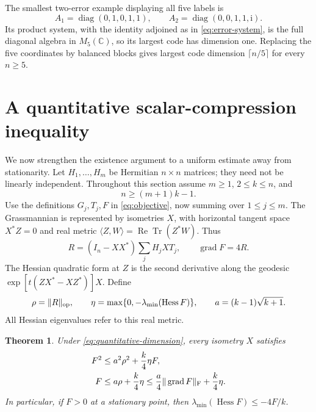 \documentclass[11pt]{article}
\newcommand{\C}{\mathbb C}
\DeclareMathOperator{\Tr}{Tr}
\newtheorem{theorem}{Theorem}[section]
\theoremstyle{remark}
\numberwithin{equation}{section}
\begin{document}
The smallest two-error example displaying all five labels is
\begin{equation}\label{eq:five-block-example}
 A_1=\operatorname{diag}(0,1,0,1,1),\qquad
 A_2=\operatorname{diag}(0,0,1,1,\mathrm{i}).
\end{equation}
Its product system, with the identity adjoined as in
\eqref{eq:error-system}, is the full diagonal algebra in $M_5(\C)$,
so its largest code has dimension one. Replacing the five coordinates
by balanced blocks gives largest code dimension $\lceil n/5\rceil$
for every $n\ge5$.

\section{A quantitative scalar-compression inequality}\label{sec:quantitative}

We now strengthen the existence argument to a uniform estimate away from
stationarity. Let $H_1,\ldots,H_m$ be Hermitian $n\times n$ matrices;
they need not be linearly independent. Throughout this section assume
$m\ge1$, $2\le k\le n$, and
\begin{equation}\label{eq:quantitative-dimension}
 n\ge(m+1)k-1.
\end{equation}
Use the definitions $G_j,T_j,F$ in \eqref{eq:objective}, now summing
over $1\le j\le m$. The Grassmannian is represented by isometries $X$,
with horizontal tangent space $X^*Z=0$ and real metric
$\langle Z,W\rangle=\operatorname{Re}\Tr(Z^*W)$. Thus
\begin{equation}\label{eq:residual-gradient}
 R=(I_n-XX^*)\sum_jH_jXT_j,\qquad \operatorname{grad}F=4R.
\end{equation}
The Hessian quadratic form at $Z$ is the second derivative along the
geodesic $\exp[t(ZX^*-XZ^*)]X$. Define
\begin{equation}\label{eq:quantitative-constants}
 \rho=\|R\|_{\rm op},\qquad
 \eta=\max\{0,-\lambda_{\min}(\operatorname{Hess}F)\},\qquad
 a=(k-1)\sqrt{k+1}.
\end{equation}
All Hessian eigenvalues refer to this real metric.

\begin{theorem}\label{thm:quantitative}
Under \eqref{eq:quantitative-dimension}, every isometry $X$ satisfies
\begin{align}
 F^2&\le a^2\rho^2+\frac{k}{4}\eta F,\label{eq:robust-quadratic}\\
 F&\le a\rho+\frac{k}{4}\eta
 \le\frac{a}{4}\|\operatorname{grad}F\|_{\rm F}
       +\frac{k}{4}\eta.\label{eq:robust-linear}
\end{align}
In particular, if $F>0$ at a stationary point, then
$\lambda_{\min}(\operatorname{Hess}F)\le-4F/k$.
\end{theorem}
\end{document}
